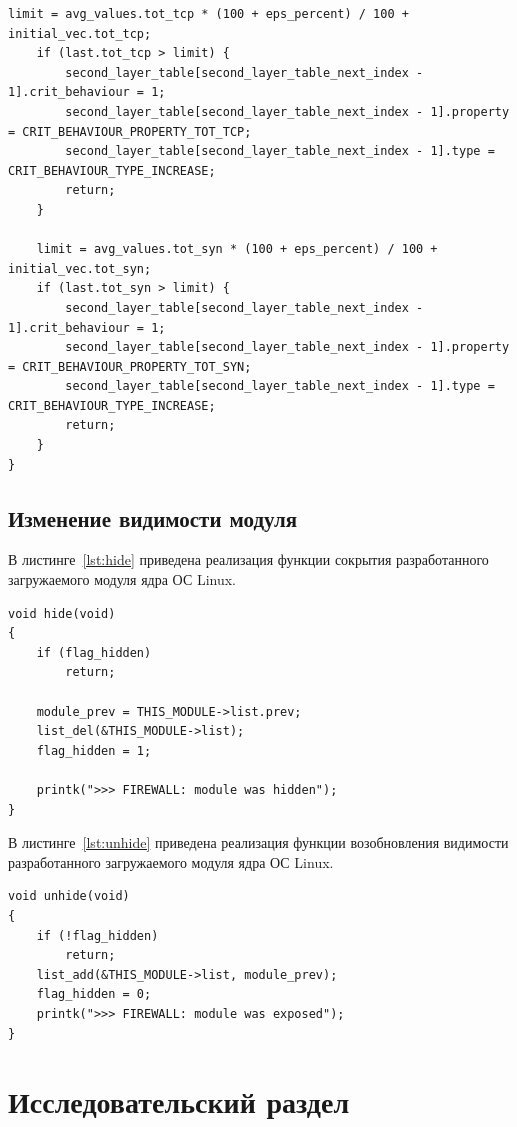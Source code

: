 \documentclass{bmstu}
\begin{document}
\begin{lstlisting}[caption = {Функции обнаружения нестандартного активности во входящем сетевом трафике}, label=lst:anomaly]
    limit = avg_values.tot_tcp * (100 + eps_percent) / 100 + initial_vec.tot_tcp;
    if (last.tot_tcp > limit) {
        second_layer_table[second_layer_table_next_index - 1].crit_behaviour = 1;
        second_layer_table[second_layer_table_next_index - 1].property = CRIT_BEHAVIOUR_PROPERTY_TOT_TCP;
        second_layer_table[second_layer_table_next_index - 1].type = CRIT_BEHAVIOUR_TYPE_INCREASE;
        return;
    }

    limit = avg_values.tot_syn * (100 + eps_percent) / 100 + initial_vec.tot_syn;
    if (last.tot_syn > limit) {
        second_layer_table[second_layer_table_next_index - 1].crit_behaviour = 1;
        second_layer_table[second_layer_table_next_index - 1].property = CRIT_BEHAVIOUR_PROPERTY_TOT_SYN;
        second_layer_table[second_layer_table_next_index - 1].type = CRIT_BEHAVIOUR_TYPE_INCREASE;
        return;
    }
}
\end{lstlisting}

\section{Изменение видимости модуля}
В листинге~\ref{lst:hide} приведена реализация функции сокрытия разработанного загружаемого модуля ядра ОС Linux.

\begin{lstlisting}[caption = {Функция сокрытия загружаемого модуля ядра}, label=lst:hide]
void hide(void)
{
    if (flag_hidden)
        return;

    module_prev = THIS_MODULE->list.prev;
    list_del(&THIS_MODULE->list);
    flag_hidden = 1;

    printk(">>> FIREWALL: module was hidden");
}
\end{lstlisting}

В листинге~\ref{lst:unhide} приведена реализация функции возобновления видимости разработанного загружаемого модуля ядра ОС Linux.

\begin{lstlisting}[caption = {Функция возобновления видимости загружаемого модуля ядра}, label=lst:unhide]
void unhide(void)
{
    if (!flag_hidden)
        return;
    list_add(&THIS_MODULE->list, module_prev);
    flag_hidden = 0;
    printk(">>> FIREWALL: module was exposed");
} 
\end{lstlisting}


\chapter{Исследовательский раздел}
\end{document}
